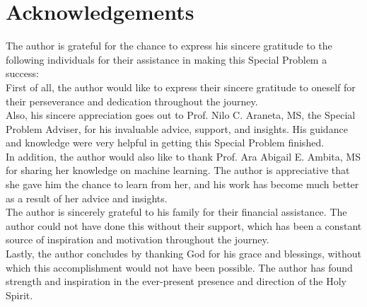 \chapter{Acknowledgements}
\label{sec:appendix_e}
The author is grateful for the chance to express his sincere gratitude to the following 
individuals for their assistance in making this Special Problem a success:
\\

First of all, the author would like to express their sincere gratitude to oneself 
for their perseverance and dedication throughout the journey.
\\

Also, his sincere appreciation goes out to Prof. Nilo C. Araneta, MS, 
the Special Problem Adviser, for his invaluable advice, support, and insights. 
His guidance and knowledge were very helpful in getting this Special Problem finished.
\\

In addition, the author would also like to thank Prof. Ara Abigail E. Ambita, MS for 
sharing her knowledge on machine learning. The author is appreciative that she gave 
him the chance to learn from her, and his work has become much better as a result of her 
advice and insights.
\\

The author is sincerely grateful to his family for their financial assistance. 
The author could not have done this without their support, which has been a constant 
source of inspiration and motivation throughout the journey.
\\

Lastly, the author concludes by thanking God for his grace and blessings, without which this 
accomplishment would not have been possible. The author has found strength and inspiration 
in the ever-present presence and direction of the Holy Spirit.
\\
